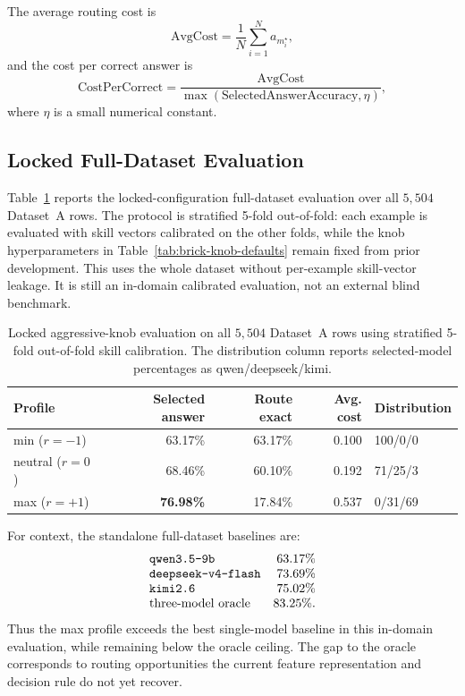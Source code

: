 The average routing cost is
\[
  \mathrm{AvgCost}
  =
  \frac{1}{N}\sum_{i=1}^{N} a_{m_i^\star},
\]
and the cost per correct answer is
\[
  \mathrm{CostPerCorrect}
  =
  \frac{\mathrm{AvgCost}}
       {\max(\mathrm{SelectedAnswerAccuracy},\eta)},
\]
where \(\eta\) is a small numerical constant.

\subsection{Locked Full-Dataset Evaluation}
\label{sec:brick-full-dataset-eval}

Table~\ref{tab:brick-full-oof} reports the locked-configuration full-dataset
evaluation over all \(5{,}504\) Dataset~A rows. The protocol is stratified
5-fold out-of-fold: each example is evaluated with skill vectors calibrated on
the other folds, while the knob hyperparameters in
Table~\ref{tab:brick-knob-defaults} remain fixed from prior development. This
uses the whole dataset without per-example skill-vector leakage. It is still an
in-domain calibrated evaluation, not an external blind benchmark.

\begin{table}[ht]
\centering
\caption{Locked aggressive-knob evaluation on all \(5{,}504\) Dataset~A rows
using stratified 5-fold out-of-fold skill calibration. The distribution column
reports selected-model percentages as qwen/deepseek/kimi.}
\label{tab:brick-full-oof}
\small
\begin{tabular}{l r r r l}
\toprule
\textbf{Profile} & \textbf{Selected answer} & \textbf{Route exact} &
\textbf{Avg. cost} & \textbf{Distribution} \\
\midrule
min (\(r=-1\))      & 63.17\% & 63.17\% & 0.100 & 100/0/0 \\
neutral (\(r=0\))   & 68.46\% & 60.10\% & 0.192 & 71/25/3 \\
max (\(r=+1\))      & \textbf{76.98\%} & 17.84\% & 0.537 & 0/31/69 \\
\bottomrule
\end{tabular}
\end{table}

For context, the standalone full-dataset baselines are:
\[
\begin{array}{l r}
\texttt{qwen3.5-9b} & 63.17\%\\
\texttt{deepseek-v4-flash} & 73.69\%\\
\texttt{kimi2.6} & 75.02\%\\
\text{three-model oracle} & 83.25\%.
\end{array}
\]
Thus the max profile exceeds the best single-model baseline in this
in-domain evaluation, while remaining below the oracle ceiling. The gap to the
oracle corresponds to routing opportunities the current feature representation
and decision rule do not yet recover.

